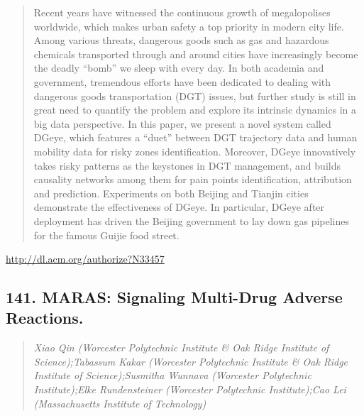 \documentclass{article}
\begin{document}
\begin{quote}
Recent years have witnessed the continuous growth of megalopolises worldwide, which makes urban safety a top priority in modern city life. Among various threats, dangerous goods such as gas and hazardous chemicals transported through and around cities have increasingly become the deadly “bomb” we sleep with every day. In both academia and government, tremendous efforts have been dedicated to dealing with dangerous goods transportation (DGT) issues, but further study is still in great need to quantify the problem and explore its intrinsic dynamics in a big data perspective. In this paper, we present a novel system called DGeye, which features a “duet” between DGT trajectory data and human mobility data for risky zones identification. Moreover, DGeye innovatively takes risky patterns as the keystones in DGT management, and builds causality networks among them for pain points identification, attribution and prediction. Experiments on both Beijing and Tianjin cities demonstrate the effectiveness of DGeye. In particular, DGeye after deployment has driven the Beijing government to lay down gas pipelines for the famous Guijie food street.
\end{quote}

\href{http://dl.acm.org/authorize?N33457}{http://dl.acm.org/authorize?N33457}

\subsection{141. MARAS: Signaling Multi-Drug Adverse Reactions.}

\begin{quote}
\footnotesize{\textit{Xiao Qin (Worcester Polytechnic Institute \& Oak Ridge Institute of Science);Tabassum Kakar (Worcester Polytechnic Institute \& Oak Ridge Institute of Science);Susmitha Wunnava (Worcester Polytechnic Institute);Elke Rundensteiner (Worcester Polytechnic Institute);Cao Lei (Massachusetts Institute of Technology)}}

\end{quote}
\end{document}
